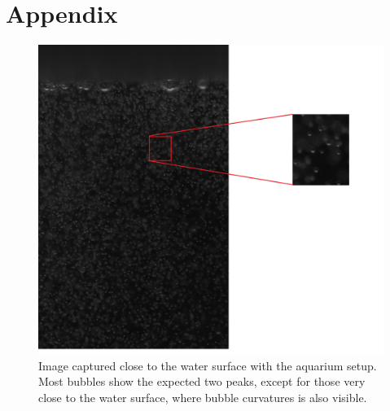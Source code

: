 \chapter*{Appendix}\label{chap:appendix}

\begin{figure}
	\centering
	\includegraphics[scale=0.4]{images/aquarium_result_surf.png}
	\caption{Image captured close to the water surface with the aquarium setup. Most bubbles show the expected two peaks, except for those very close to the water surface, where bubble curvatures is also visible.}
\end{figure}

